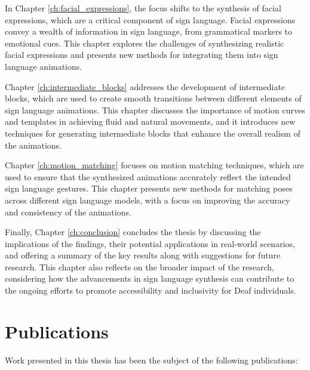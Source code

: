 \documentclass[../../main.tex]{subfiles}
\begin{document}
In Chapter \ref{ch:facial_expressions}, the focus shifts to the synthesis of facial expressions, which are a critical component of sign language. Facial expressions convey a wealth of information in sign language, from grammatical markers to emotional cues. This chapter explores the challenges of synthesizing realistic facial expressions and presents new methods for integrating them into sign language animations.

Chapter \ref{ch:intermediate_blocks} addresses the development of intermediate blocks, which are used to create smooth transitions between different elements of sign language animations. This chapter discusses the importance of motion curves and templates in achieving fluid and natural movements, and it introduces new techniques for generating intermediate blocks that enhance the overall realism of the animations.

Chapter \ref{ch:motion_matching} focuses on motion matching techniques, which are used to ensure that the synthesized animations accurately reflect the intended sign language gestures. This chapter presents new methods for matching poses across different sign language models, with a focus on improving the accuracy and consistency of the animations.

Finally, Chapter \ref{ch:conclusion} concludes the thesis by discussing the implications of the findings, their potential applications in real-world scenarios, and offering a summary of the key results along with suggestions for future research. This chapter also reflects on the broader impact of the research, considering how the advancements in sign language synthesis can contribute to the ongoing efforts to promote accessibility and inclusivity for Deaf individuals.

\section{Publications}

Work presented in this thesis has been the subject of the following publications:

\end{document}
